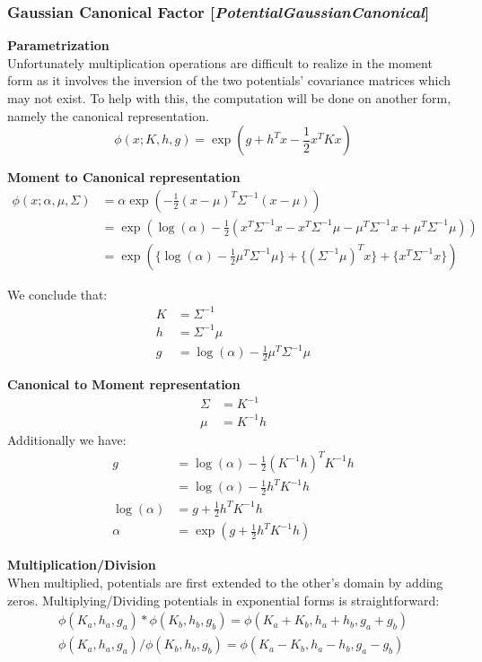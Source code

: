 \documentclass[11pt]{article}
\newcommand{\nllref}[1]{[\small{\textit{#1}}]}
\newcommand{\subsubsubsection}[1]{\noindent\textbf{#1}\\}
\begin{document}
\subsubsection{Gaussian Canonical Factor  \nllref{PotentialGaussianCanonical}}
\subsubsubsection{Parametrization}
Unfortunately multiplication operations are difficult to realize in the moment form as it involves the inversion of the two potentials' covariance matrices which may not exist. To help with this, the computation will be done on another form, namely the canonical representation.
$$
\phi(x; K, h, g) = \exp(g+h^Tx - \frac{1}{2}x^TKx)
$$

\subsubsubsection{Moment to Canonical representation}
\begin{align*}
\phi(x; \alpha, \mu, \Sigma) &= \alpha \exp ( -\frac{1}{2} (x-\mu)^T\Sigma^{-1}(x-\mu)) \\
&= \exp ( \log (\alpha) - \frac{1}{2}(x^T\Sigma^{-1}x
                                     -x^T\Sigma^{-1}\mu
                                     -\mu^T\Sigma^{-1}x
                                     +\mu^T\Sigma^{-1}\mu
                                      ))\\
&= \exp ( \{\log (\alpha) - \frac{1}{2}\mu^T\Sigma^{-1}\mu\} + \{(\Sigma^{-1}\mu)^T x\} + \{x^T\Sigma^{-1}x\} )
\end{align*}

We conclude that:
\begin{align}
K &= \Sigma^{-1}\\
h &=\Sigma^{-1}\mu\\
g &= \log (\alpha) - \frac{1}{2}\mu^T\Sigma^{-1}\mu
\end{align}

\subsubsubsection{Canonical to Moment representation}
\begin{align}
\Sigma &= K^{-1}\\
\mu &=K^{-1}h \label{meanhCanonical}
\end{align}
Additionally we have:
\begin{align}
g&= \log (\alpha) - \frac{1}{2}(K^{-1}h)^TK^{-1}h \nonumber\\
&= \log (\alpha) - \frac{1}{2}h^TK^{-1}h \nonumber\\
\log (\alpha) &= g + \frac{1}{2}h^TK^{-1}h \nonumber\\
\alpha &= \exp(g + \frac{1}{2}h^TK^{-1}h )
\end{align}

\subsubsubsection{Multiplication/Division}
When multiplied, potentials are first extended to the other's domain by adding zeros. Multiplying/Dividing potentials in exponential forms is straightforward:
\begin{align}
\phi(K_a, h_a, g_a)*\phi(K_b, h_b, g_b) = \phi(K_a + K_b, h_a + h_b, g_a + g_b)\\
\phi(K_a, h_a, g_a)/\phi(K_b, h_b, g_b) = \phi(K_a - K_b, h_a - h_b, g_a - g_b)
\end{align}
\end{document}
